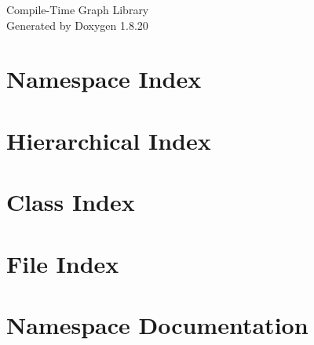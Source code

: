 \let\mypdfximage\pdfximage\def\pdfximage{\immediate\mypdfximage}\documentclass[twoside]{book}
\newcommand{\+}{\discretionary{\mbox{\scriptsize$\hookleftarrow$}}{}{}}
\newcommand{\clearemptydoublepage}{%
  \newpage{\pagestyle{empty}\cleardoublepage}%
}
\begin{document}
\hypersetup{pageanchor=false,
             bookmarksnumbered=true,
             pdfencoding=unicode
            }
\begin{titlepage}
\vspace*{7cm}
\begin{center}%
{\Large Compile-\/\+Time Graph Library }\\
\vspace*{1cm}
{\large Generated by Doxygen 1.8.20}\\
\end{center}
\end{titlepage}
\clearemptydoublepage
{}
\tableofcontents
\clearemptydoublepage
{}
\hypersetup{pageanchor=true}

\chapter{Namespace Index}

\chapter{Hierarchical Index}

\chapter{Class Index}

\chapter{File Index}

\chapter{Namespace Documentation}



\end{document}

